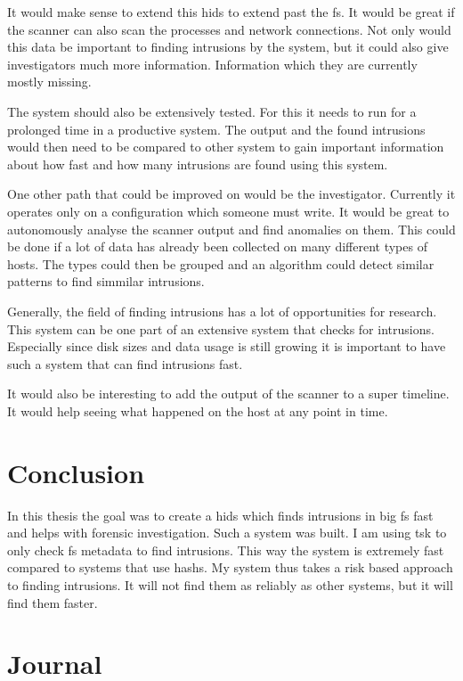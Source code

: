 \documentclass[
	a4paper,					%
	10pt,							%
	twoside,					%
	openright,				%
	notitlepage,			%
	parskip=half,			%
]{scrreprt}					%
\begin{document}
It would make sense to extend this \gls{hids} to extend past the \gls{fs}. It would be great if the scanner can also scan the processes and network connections. Not only would this data be important to finding intrusions by the system, but it could also give investigators much more information. Information which they are currently mostly missing.

The system should also be extensively tested. For this it needs to run for a prolonged time in a productive system. The output and the found intrusions would then need to be compared to other system to gain important information about how fast and how many intrusions are found using this system. 

One other path that could be improved on would be the investigator. Currently it operates only on a configuration which someone must write. It would be great to autonomously analyse the scanner output and find anomalies on them. This could be done if a lot of data has already been collected on many different types of hosts. The types could then be grouped and an algorithm could detect similar patterns to find simmilar intrusions. 

Generally, the field of finding intrusions has a lot of opportunities for research. This system can be one part of an extensive system that checks for intrusions. Especially since disk sizes and data usage is still growing it is important to have such a system that can find intrusions fast.

It would also be interesting to add the output of the scanner to a super timeline. It would help seeing what happened on the host at any point in time. 

\chapter{Conclusion}
\label{sec:Conclusion}

In this thesis the goal was to create a \gls{hids} which finds intrusions in big \gls{fs} fast and helps with forensic investigation. Such a system was built. I am using \gls{tsk} to only check \gls{fs} \gls{metadata} to find intrusions. This way the system is extremely fast compared to systems that use \glspl{hash}. My system thus takes a risk based approach to finding intrusions. It will not find them as reliably as other systems, but it will find them faster. 


\chapter{Journal}
\end{document}
